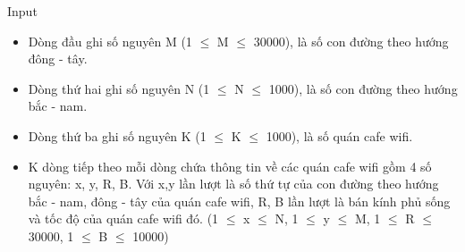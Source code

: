 Input
\begin{itemize}
	\item Dòng đầu ghi số nguyên M (1 $\le$ M $\le$ 30000), là số con đường theo hướng đông - tây.
	\item Dòng thứ hai ghi số nguyên N (1 $\le$ N $\le$ 1000), là số con đường theo hướng bắc - nam.
	\item Dòng thứ ba ghi số nguyên K (1 $\le$ K $\le$ 1000), là số quán cafe wifi.
	\item K dòng tiếp theo mỗi dòng chứa thông tin về các quán cafe wifi gồm 4 số nguyên: x, y, R, B. Với x,y lần lượt là số thứ tự của con đường theo hướng bắc - nam, đông - tây của quán cafe wifi, R, B lần lượt là bán kính phủ sống và tốc độ của quán cafe wifi đó. (1 $\le$ x $\le$ N, 1 $\le$ y $\le$ M, 1 $\le$ R $\le$ 30000, 1 $\le$ B $\le$ 10000)
\end{itemize}